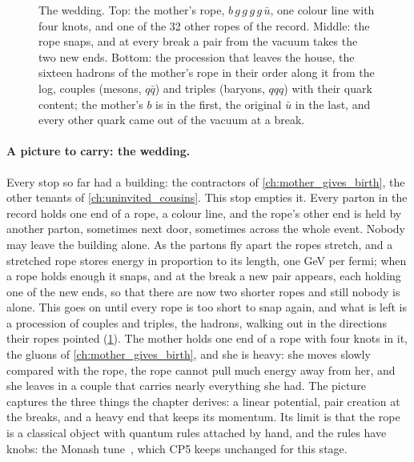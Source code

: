 \begin{figure}[htbp]\centering
\resizebox{\textwidth}{!}{}
\caption[The wedding: the ropes of the record and the chain of mesons and
baryons]{The wedding. Top: the mother's rope, $b\,g\,g\,g\,g\,\bar u$, one
colour line with four knots, and one of the 32 other ropes of the record.
Middle: the rope snaps, and at every break a pair from the vacuum takes the
two new ends. Bottom: the procession that leaves the house, the sixteen
hadrons of the mother's rope in their order along it from the 
log, couples (mesons, $q\bar q$) and triples (baryons, $qqq$) with their
quark content; the mother's $b$ is in the first, the original $\bar u$ in
the last, and every other quark came out of the vacuum at a break.}
\label{fig:children_getting_married:wedding_sketch}
\end{figure}

\paragraph{A picture to carry: the wedding.} Every stop so far had a
building: the contractors of \cref{ch:mother_gives_birth}, the other tenants
of \cref{ch:uninvited_cousins}. This stop empties it. Every parton in the
record holds one end of a rope, a colour line, and the rope's other end is
held by another parton, sometimes next door, sometimes across the whole
event. Nobody may leave the building alone. As the partons fly apart the
ropes stretch, and a stretched rope stores energy in proportion to its
length, one GeV per fermi; when a rope holds enough it snaps, and at the
break a new pair appears, each holding one of the new ends, so that there
are now two shorter ropes and still nobody is alone. This goes on until
every rope is too short to snap again, and what is left is a procession of
couples and triples, the hadrons, walking out in the directions their ropes
pointed (\cref{fig:children_getting_married:wedding_sketch}). The mother holds one end of a rope with four knots in it, the
gluons of \cref{ch:mother_gives_birth}, and she is heavy: she moves slowly
compared with the rope, the rope cannot pull much energy away from her, and
she leaves in a couple that carries nearly everything she had. The picture
captures the three things the chapter derives: a linear potential, pair
creation at the breaks, and a heavy end that keeps its momentum. Its limit
is that the rope is a classical object with quantum rules attached by hand,
and the rules have knobs: the Monash tune~\cite{Skands:2014pea}, which CP5
keeps unchanged for this stage.

